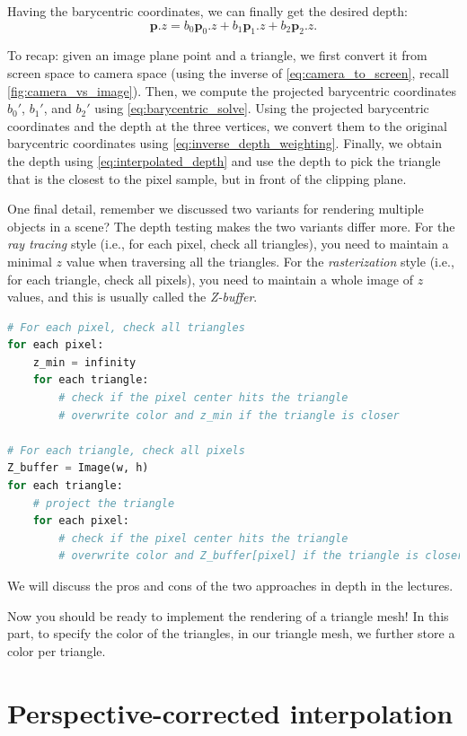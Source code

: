 Having the barycentric coordinates, we can finally get the desired depth:
\begin{equation}
\mathbf{p}.z = b_0 \mathbf{p}_0.z + b_1 \mathbf{p}_1.z + b_2 \mathbf{p}_2.z.
\label{eq:interpolated_depth}
\end{equation}

To recap: given an image plane point and a triangle, we first convert it from screen space to camera space (using the inverse of \cref{eq:camera_to_screen}, recall \cref{fig:camera_vs_image}). Then, we compute the projected barycentric coordinates $b_0'$, $b_1'$, and $b_2'$ using \cref{eq:barycentric_solve}. Using the projected barycentric coordinates and the depth at the three vertices, we convert them to the original barycentric coordinates using \cref{eq:inverse_depth_weighting}. Finally, we obtain the depth using \cref{eq:interpolated_depth} and use the depth to pick the triangle that is the closest to the pixel sample, but in front of the clipping plane.

One final detail, remember we discussed two variants for rendering multiple objects in a scene? The depth testing makes the two variants differ more. For the \emph{ray tracing} style (i.e., for each pixel, check all triangles), you need to maintain a minimal $z$ value when traversing all the triangles. For the \emph{rasterization} style (i.e., for each triangle, check all pixels), you need to maintain a whole image of $z$ values, and this is usually called the \emph{Z-buffer}. 
\begin{lstlisting}[language=Python]
# For each pixel, check all triangles
for each pixel:
    z_min = infinity
    for each triangle:
        # check if the pixel center hits the triangle
        # overwrite color and z_min if the triangle is closer

# For each triangle, check all pixels
Z_buffer = Image(w, h)
for each triangle:
    # project the triangle
    for each pixel:
        # check if the pixel center hits the triangle
        # overwrite color and Z_buffer[pixel] if the triangle is closer
\end{lstlisting}
We will discuss the pros and cons of the two approaches in depth in the lectures.

Now you should be ready to implement the rendering of a triangle mesh! In this part, to specify the color of the triangles, in our triangle mesh, we further store a color per triangle. 

\section{Perspective-corrected interpolation}

